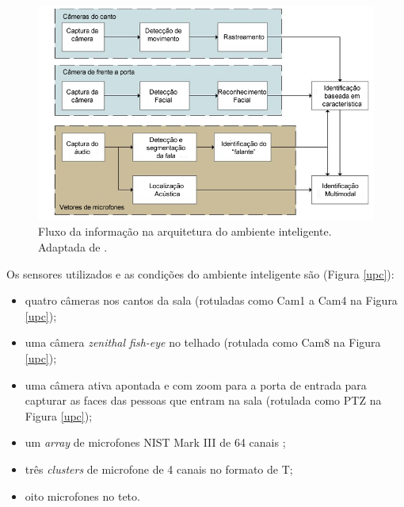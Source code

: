 	\begin{figure}[hbt]
		\begin{center}
			\includegraphics[scale=0.5]{figuras/3.TrabalhosCorrelatos/workflow.png}
		\end{center}
		\caption{Fluxo da informação na arquitetura do ambiente
		inteligente. Adaptada de \cite{salah}.}
		\label{workflow}
	\end{figure}

Os sensores utilizados e as condições do ambiente inteligente são (Figura \ref{upc}):

	\begin{itemize}
		\item quatro câmeras nos cantos da sala (rotuladas como Cam1 a Cam4 na Figura \ref{upc});
		\item uma câmera \textit{zenithal fish-eye} no telhado (rotulada como Cam8 na Figura \ref{upc});
		\item uma câmera ativa apontada e com zoom para a porta de entrada para capturar as faces das pessoas que entram na sala (rotulada como PTZ na Figura \ref{upc});
		\item um \textit{array} de microfones NIST Mark III de 64 canais ;
		\item três \textit{clusters} de microfone de 4 canais no formato de T;
		\item oito microfones no teto.
	\end{itemize}

